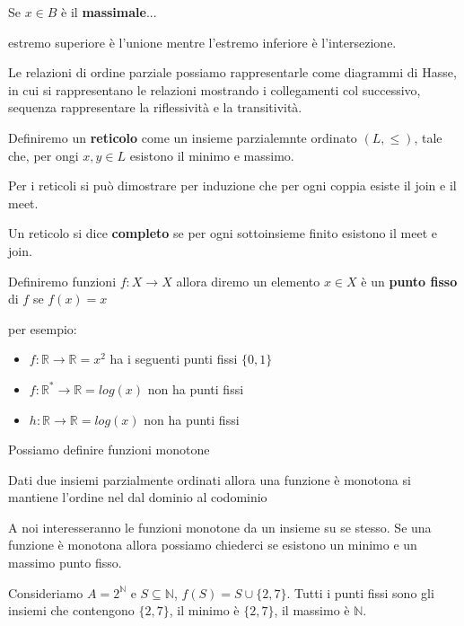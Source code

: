 Se $x\in B$ è il \textbf{massimale}...

\begin{esempio} 
    estremo superiore è l'unione mentre l'estremo inferiore è l'intersezione.


\end{esempio}

Le relazioni di ordine parziale possiamo rappresentarle come diagrammi di Hasse,
in cui si rappresentano le relazioni mostrando i collegamenti col successivo, sequenza
rappresentare la riflessività e la transitività.

\begin{definizione}
    Definiremo un \textbf{reticolo}  come un insieme parzialemnte ordinato $(L,\le)$,
    tale che, per ongi $x,y\in L$ esistono il minimo e massimo.
\end{definizione}
Per i reticoli si può dimostrare per induzione che per ogni coppia esiste il join
e il meet.

\begin{definizione}
    Un reticolo si dice \textbf{completo} se per ogni sottoinsieme finito esistono
    il meet e join. 
\end{definizione}

\begin{definizione}
    Definiremo funzioni $f:X\to X$ allora diremo un elemento $x\in X$ è un \textbf{punto 
    fisso} di $f$ se $f(x)=x$    
\end{definizione}
\begin{esempio}
    per esempio:
    \begin{itemize}
        \item $f:\mathbb{R}\to\mathbb{R}=x^2$ ha i seguenti punti fissi $\{0,1\}$
        \item $f:\mathbb{R}^*\to\mathbb{R}=log(x)$ non ha punti fissi
        \item $h:\mathbb{R}\to\mathbb{R}=log(x)$ non ha punti fissi
    \end{itemize}
\end{esempio}

Possiamo definire funzioni monotone
\begin{definizione}
    Dati due insiemi parzialmente ordinati allora una funzione è monotona
    si mantiene l'ordine nel dal dominio al codominio
\end{definizione}
A noi interesseranno le funzioni monotone da un insieme su se stesso.
Se una funzione è monotona allora possiamo chiederci se esistono un minimo e un 
massimo punto fisso.
\begin{esempio}
    Consideriamo $A = 2^\mathbb{N}$ e $S\subseteq \mathbb{N}$, $f(S)=S\cup \{2,7\}$.
    Tutti i punti fissi sono gli insiemi che contengono $\{2,7\}$, il minimo è
    $\{2,7\}$, il massimo è $\mathbb{N}$.
\end{esempio}

